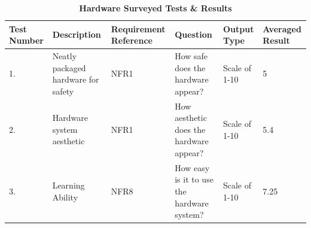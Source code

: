 \documentclass[12pt, titlepage]{article}
\begin{document}
\newpage
\begin{table}[H]
\caption{\bf Hardware Surveyed Tests \& Results}
\begin{tabular}{ |p{1cm}|p{2.2cm}|p{2.5cm}|p{2.4cm}|p{2cm}|p{2cm}| }
\hline
\bf Test Number & \bf Description & \bf Requirement Reference & \bf Question & \bf Output Type & \bf Averaged Result\\
\hline
1. & Neatly packaged hardware for safety & NFR1 & How safe does the hardware appear? & Scale of 1-10 & 5\\
\hline
2. & Hardware system aesthetic & NFR1 & How aesthetic does the hardware appear? & Scale of 1-10 & 5.4\\
\hline
3. & Learning Ability & NFR8 & How easy is it to use the hardware system? & Scale of 1-10 & 7.25\\
\hline 
\end{tabular}
\end{table}
\end{document}
